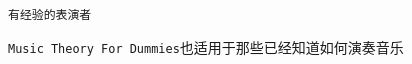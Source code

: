 \texttt{有经验的表演者}

\texttt{Music Theory For Dummies}也适用于那些已经知道如何演奏音乐


	
	
	
	
	
	
	
	
	
	
	
	
	
	
	
	
	
	
	
	
	
	
	
	
	
	

	
	
	
	
	
	
	
	
	
	
	
	
	
	
	
	
	
	
	
	
	

